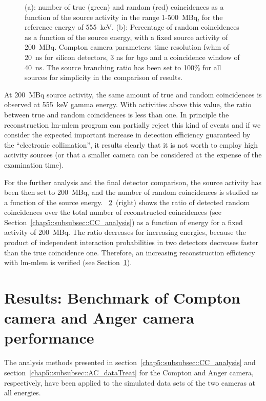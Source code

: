 \begin{figure}
\begin{subfigure}[t]{.5\textwidth}
  \label{chap5::fig::timing_energy}
\end{subfigure}
\caption{(a): number of true (green) and random (red) coincidences as a function of the source activity in the range 1-500~MBq, for the reference energy of 555~keV. (b): Percentage of random coincidences as a function of the source energy, with a fixed source activity of 200~MBq. Compton camera parameters: time resolution \gls{fwhm} of 20~ns for silicon detectors, 3 ns for \gls{bgo} and a coincidence window of 40~ns. The source branching ratio has been set to 100\% for all sources for simplicity in the comparison of results.}
\label{chap5::fig::timig_en_coinc}
\end{figure} 

At 200~MBq source activity, the same amount of true and random coincidences is observed at 555~keV gamma energy. With activities above this value, the ratio between true and random coincidences is less than one. In principle the reconstruction \gls{lm-mlem} program can partially reject this kind of events and if we consider the expected important increase in detection efficiency guaranteed by the \enquote{electronic collimation}, it results clearly that it is not worth to employ high activity sources (or that a smaller camera can be considered at the expense of the examination time).

For the further analysis and the final detector comparison, the source activity has been then set to 200~MBq, and the number of random coincidences is studied as a function of the source energy. \figurename~\ref{chap5::fig::timig_en_coinc}~(right) shows the ratio of detected random coincidences over the total number of reconstructed coincidences (see Section~\ref{chap5::subsubsec::CC_analysis}) as a function of energy for a fixed activity of 200~MBq. The ratio decreases for increasing energies, because the product of independent interaction probabilities in two detectors decreases faster than the true coincidence one. Therefore, an increasing reconstruction efficiency with \gls{lm-mlem} is verified (see Section~\ref{chap5::sec::Results_benchmark}).

\section{Results: Benchmark of Compton camera and Anger camera performance}\label{chap5::sec::Results_benchmark}

The analysis methods presented in section~\ref{chap5::subsubsec::CC_analysis} and section~\ref{chap5::subsubsec::AC_dataTreat} for the Compton and Anger camera, respectively, have been applied to the simulated data sets of the two cameras at all energies.


